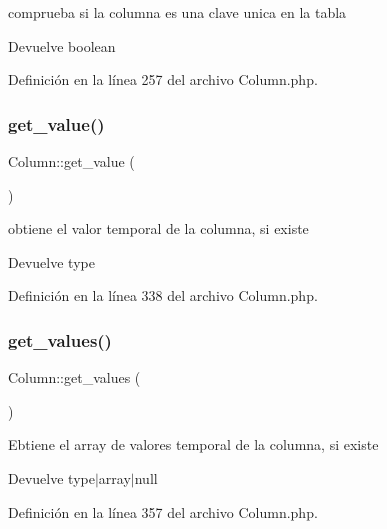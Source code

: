 comprueba si la columna es una clave unica en la tabla

\begin{DoxyReturn}{Devuelve}
boolean 
\end{DoxyReturn}


Definición en la línea 257 del archivo Column.\+php.

\mbox{\label{class_column_a16ae34425bea11e5f6435f2a8987a798}} 
\subsubsection{\texorpdfstring{get\_value()}{get\_value()}}
{\footnotesize\ttfamily Column\+::get\+\_\+value (\begin{DoxyParamCaption}{ }\end{DoxyParamCaption})}

obtiene el valor temporal de la columna, si existe

\begin{DoxyReturn}{Devuelve}
type 
\end{DoxyReturn}


Definición en la línea 338 del archivo Column.\+php.

\mbox{\label{class_column_a58db8b06f4c93ec071a51a1f76009052}} 
\subsubsection{\texorpdfstring{get\_values()}{get\_values()}}
{\footnotesize\ttfamily Column\+::get\+\_\+values (\begin{DoxyParamCaption}{ }\end{DoxyParamCaption})}

Ebtiene el array de valores temporal de la columna, si existe

\begin{DoxyReturn}{Devuelve}
type$\vert$array$\vert$null 
\end{DoxyReturn}


Definición en la línea 357 del archivo Column.\+php.

\mbox{\label{class_column_a58959194643294bb27c06cf13584f79a}} 
